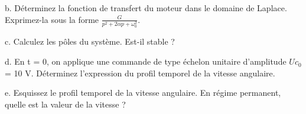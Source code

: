 	b. Déterminez la fonction de transfert du moteur dans le domaine de Laplace. Exprimez-la sous la forme $\frac{G}{p^{2}+2\alpha p+\omega_{0}^{2}}$.
	
	c. Calculez les pôles du système. Est-il stable ?
	
	d. En t = 0, on applique une commande de type échelon unitaire d'amplitude $Uc_{0}$ = 10 V. Déterminez l'expression du profil temporel de la vitesse angulaire.
	
	e. Esquissez le profil temporel de la vitesse angulaire. En régime permanent, quelle est la valeur de la vitesse ? 
	
	
	
	
		
	\newpage
	